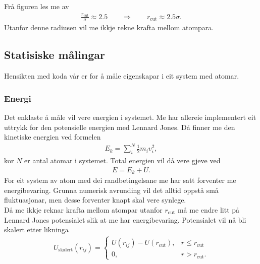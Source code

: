 \documentclass[12pt, a4paper]{article}
\theoremstyle{definition} \newtheorem*{definition}{Teorem}
\begin{document}
            Frå figuren les me av 
            \begin{align*}
                \frac{r_{\text{cut}}}{\sigma} \approx 2.5 \qquad \Rightarrow \qquad r_{\text{cut}} \approx 2.5\sigma.
            \end{align*}
            Utanfor denne radiusen vil me ikkje rekne krafta mellom atompara.


    \newpage

    \subsection*{Statisiske målingar}
        Hensikten med koda vår er for å måle eigenskapar i eit system med atomar.

        \subsubsection*{Energi}
            Det enklaste å måle vil vere energien i systemet. Me har allereie implementert eit uttrykk for den potensielle energien med Lennard Jones. Då finner me
            den kinetiske energien ved formelen
            \begin{align*}
                E_{k} = \sum_{i}^N\frac{1}{2}m_iv_{i}^2,
            \end{align*}
            kor $N$ er antal atomar i systemet. Total energien vil då vere gjeve ved
            \begin{align*}
                E = E_{k} + U.
            \end{align*}
            For eit system av atom med dei randbetingelsane me har satt forventer me energibevaring. Grunna numerisk avrunding vil det alltid oppstå små fluktuasjonar,
            men desse forventer knapt skal vere synlege. \\

            Då me ikkje reknar krafta mellom atompar utanfor $r_{\text{cut}}$ må me endre litt på Lennard Jones potensialet slik at me har energibevaring. 
            Potensialet vil nå bli skalert etter likninga
            \begin{align*}
                U_{\text{skalert}}(r_{ij}) = 
                \begin{cases}
                    U(r_{ij}) - U(r_{\text{cut}}), & r \leq r_{\text{cut}} \\
                    0, & r > r_{\text{cut}}.
                \end{cases}
            \end{align*}
\end{document}
